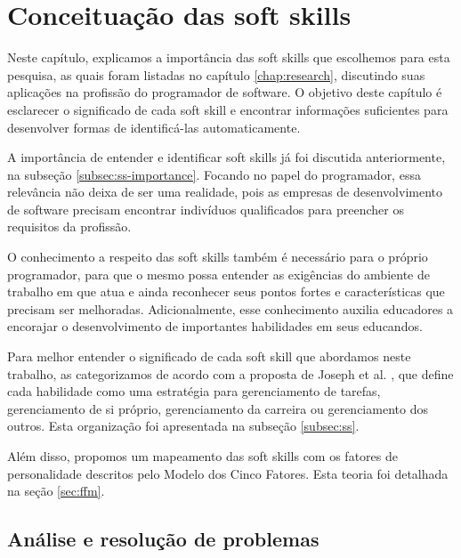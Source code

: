 

\chapter{Conceituação das soft skills}

\label{chap:concepts}

Neste capítulo, explicamos a importância das soft skills que escolhemos para esta pesquisa, as quais foram listadas no capítulo \ref{chap:research}, discutindo suas aplicações na profissão do programador de software. O objetivo deste capítulo é esclarecer o significado de cada soft skill e encontrar informações suficientes para desenvolver formas de identificá-las automaticamente.

A importância de entender e identificar soft skills já foi discutida anteriormente, na subseção \ref{subsec:ss-importance}. Focando no papel do programador, essa relevância não deixa de ser uma realidade, pois as empresas de desenvolvimento de software precisam encontrar indivíduos qualificados para preencher os requisitos da profissão.

O conhecimento a respeito das soft skills também é necessário para o próprio programador, para que o mesmo possa entender as exigências do ambiente de trabalho em que atua e ainda reconhecer seus pontos fortes e características que precisam ser melhoradas. Adicionalmente, esse conhecimento auxilia educadores a encorajar o desenvolvimento de importantes habilidades em seus educandos.

Para melhor entender o significado de cada soft skill que abordamos neste trabalho, as categorizamos de acordo com a proposta de Joseph et al. \cite{joseph:99} \cite{joseph:10}, que define cada habilidade como uma estratégia para gerenciamento de tarefas, gerenciamento de si próprio, gerenciamento da carreira ou gerenciamento dos outros. Esta organização foi apresentada na subseção \ref{subsec:ss}.

Além disso, propomos um mapeamento das soft skills com os fatores de personalidade descritos pelo Modelo dos Cinco Fatores. Esta teoria foi detalhada na seção \ref{sec:ffm}.

\section{Análise e resolução de problemas}

